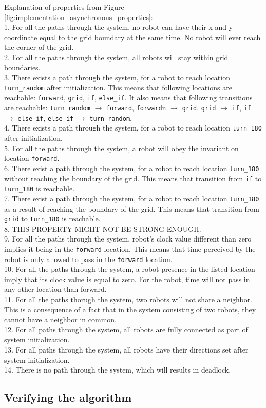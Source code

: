 \noindent
Explanation of properties from Figure \ref{fig:implementation_asynchronous_properties}:\\
1. For all the paths through the system, no robot can have their x and y coordinate equal to the grid boundary at the same time. No robot will ever reach the corner of the grid.\\
2. For all the paths through the system, all robots will stay within grid boundaries.\\
3. There exists a path through the system, for a robot to reach location \texttt{turn\_random} after initialization. This means that following locations are reachable: \texttt{forward}, \texttt{grid}, \texttt{if}, \texttt{else\_if}. It also means that following transitions are reachable: \texttt{turn\_random} $\rightarrow$ \texttt{forward}, \texttt{forward}n $\rightarrow$ \texttt{grid}, \texttt{grid} $\rightarrow$ \texttt{if}, \texttt{if} $\rightarrow$ \texttt{else\_if}, \texttt{else\_if} $\rightarrow$ \texttt{turn\_random}.\\ 
4. There exists a path through the system, for a robot to reach location \texttt{turn\_180} after initialization.\\
5. For all the paths through the system, a robot will obey the invariant on location \texttt{forward}.\\
6. There exist a path through the system, for a robot to reach location \texttt{turn\_180} without reaching the boundary of the grid. This means that transition from \texttt{if} to \texttt{turn\_180} is reachable.\\
7. There exist a path through the system, for a robot to reach location \texttt{turn\_180} as a result of reaching the boundary of the grid. This means that transition from \texttt{grid} to \texttt{turn\_180} is reachable.\\
8. THIS PROPERTY MIGHT NOT BE STRONG ENOUGH.\\
9. For all the paths through the system, robot's clock value different than zero implies it being in the \texttt{forward} location. This means that time perceived by the robot is only allowed to pass in the \texttt{forward} location.\\
10. For all the paths through the system, a robot presence in the listed location imply that its clock value is equal to zero. For the robot, time will not pass in any other location than forward.\\
11. For all the paths thorugh the system, two robots will not share a neighbor. This is a consequence of a fact that in the system consisting of two robots, they cannot have a neighbor in common.\\
12. For all paths through the system, all robots are fully connected as part of system initialization.\\
13. For all paths through the system, all robots have their directions set after system initialization.\\
14. There is no path through the system, which will results in deadlock.\\





\subsection{Verifying the algorithm}
